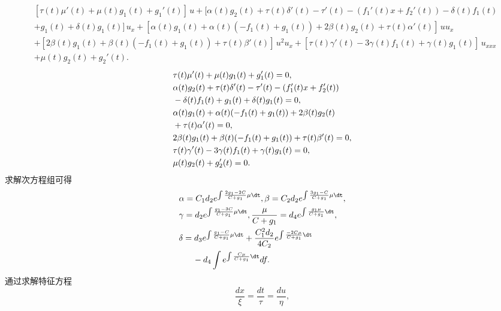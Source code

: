 \begin{equation}
\begin{aligned}
  &[\tau(t)\mu'(t)+\mu(t)g_1(t)+g_1'(t)]\,u
  +[\alpha(t)g_2(t)+\tau(t)\delta'(t)
  -\tau'(t)-(f_1'(t)x+f_2'(t))-\delta(t)f_1(t)\\
  &+g_1(t)+\delta(t)g_1(t)]\,u_x
  +[\alpha(t)g_1(t)+\alpha(t)(-f_1(t)+g_1(t))+2\beta(t)g_2(t)+\tau(t)\alpha'(t)]\,uu_x\\
  &+[2\beta(t)g_1(t)+\beta(t)(-f_1(t)+g_1(t))+\tau(t)\beta'(t)]\,u^2u_x
  +[\tau(t)\gamma'(t)-3\gamma(t)f_1(t)+\gamma(t)g_1(t)]\,u_{xxx}\\
  &+\mu(t)g_2(t)+g_2'(t).
\end{aligned}
\end{equation}
\begin{align}
  &\tau(t)\mu'(t)+\mu(t)g_1(t)+g_1'(t)=0,\notag\\%
  &\alpha(t)g_2(t)+\tau(t)\delta'(t)-\tau'(t)-(f_1'(t)x+f_2'(t))\notag\\
  &-\delta(t)f_1(t)+g_1(t)+\delta(t)g_1(t)=0,\notag\\%
  &\alpha(t)g_1(t)+\alpha(t)(-f_1(t)+g_1(t))+2\beta(t)g_2(t)\notag\\
  &+\tau(t)\alpha'(t)=0,\notag\\%
  &2\beta(t)g_1(t)+\beta(t)(-f_1(t)+g_1(t))+\tau(t)\beta'(t)=0,\notag\\%
  &\tau(t)\gamma'(t)-3\gamma(t)f_1(t)+\gamma(t)g_1(t)=0,\notag\\%
  &\mu(t)g_2(t)+g_2'(t)=0.%
\end{align}
求解次方程组可得
\begin{align}\label{Lie-coe-tj}
&\alpha=C_1 d_2 e^{\int\frac{2g_1-2C}{C+g_1}\mu\dt},
\beta=C_2 d_2 e^{\int\frac{3g_1-C}{C+g_1}\mu\dt},\notag\\
&\gamma=d_2 e^{\int\frac{g_1-3C}{C+g_1}\mu\dt},\frac{\mu}{C+g_1}=d_4 e^{\int \frac{g_1\mu}{C+g_1}\dt},\notag\\
&\delta=d_3e^{\int\frac{g_1-C}{C+g_1}\mu\dt}+\frac{C_1^2d_2}{4C_2}e^{\int\frac{-2C\mu}{C+g_1}\dt}\notag\\
&\;\;\;\;\;\;-d_4\int e^{\int\frac{C\mu}{C+g_1}\dt}df.
\end{align}
通过求解特征方程
\begin{equation}
\frac{d x}{\xi}=\frac{d t}{\tau}=\frac{d u}{\eta},
\end{equation}
